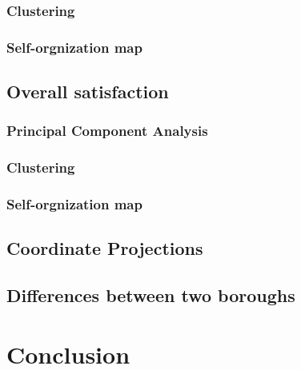 \documentclass[12pt]{article}
\begin{document}
\subsubsection{Clustering}

\subsubsection{Self-orgnization map}

\subsection{Overall satisfaction}
\subsubsection{Principal Component Analysis}
\subsubsection{Clustering}
\subsubsection{Self-orgnization map}
\subsection{Coordinate Projections}
\subsection{Differences between two boroughs}
\section{Conclusion}

\newpage

\end{document}
